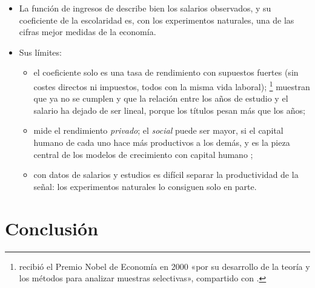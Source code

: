 \documentclass[11pt]{article}
\begin{document}
\begin{itemize}
\item La función de ingresos de  describe bien los salarios observados, y su coeficiente de la escolaridad es, con los experimentos naturales, una de las cifras mejor medidas de la economía.
\item Sus límites:
  \begin{itemize}
  \item el coeficiente solo es una tasa de rendimiento con supuestos fuertes (sin costes directos ni impuestos, todos con la misma vida laboral); \textcite{HeckmanLochnerTodd2006Earnings}\footnote{ recibió el Premio Nobel de Economía en 2000 «por su desarrollo de la teoría y los métodos para analizar muestras selectivas», compartido con \nocite{Nobel2000HeckmanMcFadden}.} muestran que ya no se cumplen y que la relación entre los años de estudio y el salario ha dejado de ser lineal, porque los títulos pesan más que los años;
  \item mide el rendimiento \emph{privado}; el \emph{social} puede ser mayor, si el capital humano de cada uno hace más productivos a los demás, y es la pieza central de los modelos de crecimiento con capital humano  ;
  \item con datos de salarios y estudios es difícil separar la productividad de la señal: los experimentos naturales lo consiguen solo en parte.
  \end{itemize}
\end{itemize}

\section*{Conclusión}
\end{document}
